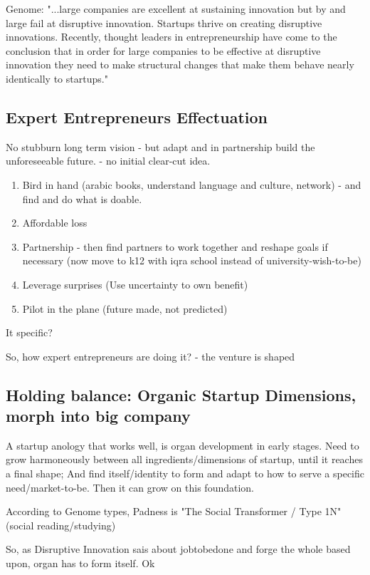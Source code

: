 \documentclass[a4paper,10pt]{book}
\begin{document}
Genome:
"...large companies are excellent at sustaining
innovation but by and large fail at disruptive innovation. Startups thrive on
creating disruptive innovations. Recently, thought leaders in entrepreneurship
have come to the conclusion that in order for large companies to be effective at
disruptive innovation they need to make structural changes that make them
behave nearly identically to startups."

\subsection{Expert Entrepreneurs Effectuation}
No stubburn long term vision - but adapt and in partnership build the unforeseeable future.
 - no initial clear-cut idea.

\begin{enumerate}
 \item Bird in hand (arabic books, understand language and culture, network) - and find and do what is doable.
 \item Affordable loss
 \item Partnership - then find partners to work together and reshape goals if necessary (now move to k12 with iqra school instead of university-wish-to-be)
 \item Leverage surprises (Use uncertainty to own benefit)
 \item Pilot in the plane (future made, not predicted)
\end{enumerate}

It specific?
 
So, how expert entrepreneurs are doing it?
 - the venture is shaped 
 
 
\subsection{Holding balance: Organic Startup Dimensions, morph into big company}
A startup anology that works well, is organ development in early stages. 
Need to grow harmoneously between all ingredients/dimensions of startup, until it reaches a final shape;
And find itself/identity to form and adapt to how to serve a specific need/market-to-be.
Then it can grow on this foundation.

According to Genome types, Padness is "The Social Transformer / Type 1N" (social reading/studying)

So, as Disruptive Innovation sais about jobtobedone and forge the whole based upon, organ has to form itself. Ok
\end{document}
